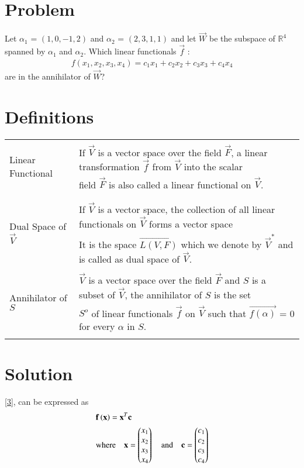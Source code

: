 \documentclass[journal,12pt,twocolumn]{IEEEtran}
\newcommand\myemptypage{
	\null
	\thispagestyle{empty}
	\addtocounter{page}{-1}
	\newpage
}
\begin{document}
\section{Problem}
Let $\alpha_1$ = $(1, 0,-1, 2)$ and $\alpha_2$ = $(2,3, 1,1)$ and let $\vec{W}$ be the subspace of $\mathbb{R}^4$ spanned by $\alpha_1$ and $\alpha_2$. Which linear functionals $\vec{f}$ :
\begin{align}
f(x_1,x_2,x_3,x_4) = c_1x_1 + c_2x_2 + c_3x_3 + c_4x_4 \label{3} 
\end{align}
are in the annihilator of $\vec{W}$?
\section{Definitions}
\begin{table}[hp]
	\begin{tabular}{|l|l|}
		\hline
		\multirow{3}{*}{Linear Functional} & \\
		& If $\vec{V}$ is a vector space over the field $\vec{F}$, a linear transformation $\vec{f}$ from $\vec{V}$
		into the scalar \\
		& field $\vec{F}$ is also called a linear functional on $\vec{V}$. \\
		& \\
		\hline
		\multirow{3}{*}{Dual Space of $\vec{V}$} & \\
		& If $\vec{V}$ is a vector space, the collection of all linear functionals on $\vec{V}$ forms a vector space\\
		& It is the space $\vec{L(V, F)}$ which we denote by $\vec{V}^{*}$ and is called as dual space of $\vec{V}$.\\
		\hline
		\multirow{3}{*}{Annihilator of $S$} & \\
		& $\vec{V}$ is a vector space over the field $\vec{F}$ and $S$ is a subset of $\vec{V}$, the annihilator of $S$ is the set \\
		& $S^{o}$ of linear functionals $\vec{f}$ on $\vec{V}$ such that $\vec{f(\alpha)}$ = 0 for every $\alpha$ in $S$. \\
		& \\
		\hline
	\end{tabular}
\end{table}
\section{Solution}
\pagebreak
\myemptypage
\eqref{3}, can be expressed as
\begin{align}
& \mathbf{f}\left(\mathbf{x}\right) = \mathbf{x}^T\mathbf{c} \label{5} \\
& \text{where} \quad \mathbf{x} = \begin{pmatrix}x_1 \\ x_2 \\ x_3 \\ x_4\end{pmatrix} \quad \text{and} \quad \mathbf{c} = \begin{pmatrix}c_1 \\ c_2 \\ c_3 \\ c_4\end{pmatrix}
\end{align}
 
\end{document}
